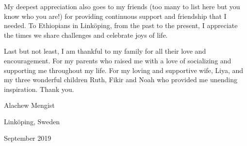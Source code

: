 My deepest appreciation also goes to my friends (too many to list here but you know who you are!) for providing continuous support and friendship that I needed. 
To Ethiopians in Linköping, from the past to the present, I appreciate the times we share challenges and celebrate joys of life. 

Last but not least, I am thankful to my family for all their love and encouragement. For my parents who raised me with a love of socializing and supporting 
me throughout my life. For my loving and supportive wife, Liya, and my three wonderful children Ruth, Fikir and Noah who provided me unending inspiration. Thank you.


\begin{flushright}
	Alachew Mengist
	
	Link\"{o}ping, Sweden
	
	September 2019
\end{flushright}




